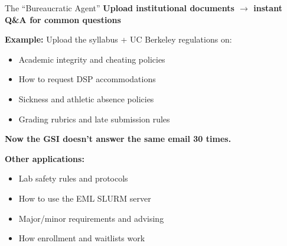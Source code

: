 \documentclass[aspectratio=169]{beamer}
\begin{document}
\begin{frame}{The ``Bureaucratic Agent''}
    \textbf{Upload institutional documents $\rightarrow$ instant Q\&A for common questions}

    \vspace{1em}
    \textbf{Example:} Upload the syllabus + UC Berkeley regulations on:
    \begin{itemize}
        \item Academic integrity and cheating policies
        \item How to request DSP accommodations
        \item Sickness and athletic absence policies
        \item Grading rubrics and late submission rules
    \end{itemize}

    \vspace{1em}
    \textbf{Now the GSI doesn't answer the same email 30 times.}

    \vspace{1em}
    \textbf{Other applications:}
    \begin{itemize}
        \item Lab safety rules and protocols
        \item How to use the EML SLURM server
        \item Major/minor requirements and advising
        \item How enrollment and waitlists work
    \end{itemize}
\end{frame}

\end{document}
